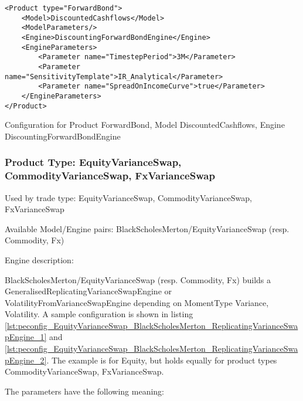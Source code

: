\begin{longlisting}
\begin{verbatim}
<Product type="ForwardBond">
    <Model>DiscountedCashflows</Model>
    <ModelParameters/>
    <Engine>DiscountingForwardBondEngine</Engine>
    <EngineParameters>
        <Parameter name="TimestepPeriod">3M</Parameter>
        <Parameter name="SensitivityTemplate">IR_Analytical</Parameter>
        <Parameter name="SpreadOnIncomeCurve">true</Parameter>
    </EngineParameters>
</Product>
\end{verbatim}
\caption{Configuration for Product ForwardBond, Model DiscountedCashflows, Engine DiscountingForwardBondEngine}
\label{lst:peconfig_ForwardBond_DiscountedCashflows_DiscountingForwardBondEngine}
\end{longlisting}

\subsubsection{Product Type: EquityVarianceSwap, CommodityVarianceSwap, FxVarianceSwap}

Used by trade type: EquityVarianceSwap, CommodityVarianceSwap, FxVarianceSwap

Available Model/Engine pairs: BlackScholesMerton/EquityVarianceSwap (resp. Commodity, Fx)

Engine description:

BlackScholesMerton/EquityVarianceSwap (resp. Commodity, Fx) builds a GeneralisedReplicatingVarianceSwapEngine or
VolatilityFromVarianceSwapEngine depending on MomentType Variance, Volatility. A sample configuration is shown in
listing \ref{lst:peconfig_EquityVarianceSwap_BlackScholesMerton_ReplicatingVarianceSwapEngine_1} and
\ref{lst:peconfig_EquityVarianceSwap_BlackScholesMerton_ReplicatingVarianceSwapEngine_2}. The example is for Equity, but
holds equally for product types CommodityVarianceSwap, FxVarianceSwap.

The parameters have the following meaning:

